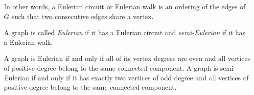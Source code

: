 \begin{page}
\setcounter{section}{1}
\setcounter{subsection}{6}
\setcounter{dfn}{19}
\label{portion:238}

In other words, a Eulerian circuit or Eulerian walk is an ordering of the edges of $G$
such that two consecutive edges share a vertex.

A graph is called \emph{Eulerian} if it has a Eulerian circuit and \emph{semi-Eulerian} if it has a Eulerian walk.


\end{page}

\begin{page}
\setcounter{section}{1}
\setcounter{subsection}{6}
\setcounter{dfn}{20}
\label{portion:240}

\begin{thm}
A graph is Eulerian if and only if all of its vertex degrees are even
and all vertices of positive degree belong to the same connected component.
A graph is semi-Eulerian if and only if it has exactly two vertices of odd degree
and all vertices of positive degree belong to the same connected component.
\end{thm}

\end{page}

